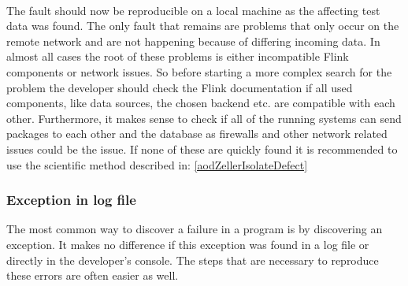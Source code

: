 \paragraph{} The fault should now be reproducible on a local machine as the affecting test data was found. The only fault that remains are problems that only occur on the remote network and are not happening because of differing incoming data. In almost all cases the root of these problems is either incompatible Flink components or network issues. So before starting a more complex search for the problem the developer should check the Flink documentation if all used components, like data sources, the chosen backend etc. are compatible with each other. Furthermore, it makes sense to check if all of the running systems can send packages to each other and the database as firewalls and other network related issues could be the issue. If none of these are quickly found it is recommended to use the scientific method described in: \ref{aodZellerIsolateDefect}

\subsubsection{Exception in log file}
The most common way to discover a failure in a program is by discovering an exception. It makes no difference if this exception was found in a log file or directly in the developer's console. The steps that are necessary to reproduce these errors are often easier as well.

